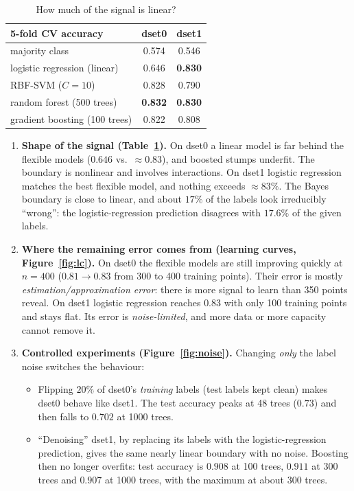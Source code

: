 \documentclass[11pt]{article}
\begin{document}
\begin{table}[H]\centering\small
\begin{tabular}{lcc}
\toprule
5-fold CV accuracy & dset0 & dset1\\
\midrule
majority class                     & 0.574 & 0.546\\
logistic regression (linear)       & 0.646 & \textbf{0.830}\\
RBF-SVM ($C=10$)                   & 0.828 & 0.790\\
random forest (500 trees)          & \textbf{0.832} & \textbf{0.830}\\
gradient boosting (100 trees)      & 0.822 & 0.808\\
\bottomrule
\end{tabular}
\caption{How much of the signal is linear?}
\label{tab:diag}
\end{table}

\begin{enumerate}
\item \textbf{Shape of the signal (Table~\ref{tab:diag}).} On dset0 a linear model is far behind
the flexible models ($0.646$ vs.\ $\approx0.83$), and boosted stumps underfit. The boundary is
nonlinear and involves interactions. On dset1 logistic regression matches the best flexible model,
and nothing exceeds $\approx83\%$. The Bayes boundary is close to linear, and about $17\%$ of the
labels look irreducibly ``wrong'': the logistic-regression prediction disagrees with $17.6\%$ of
the given labels.

\item \textbf{Where the remaining error comes from (learning curves, Figure~\ref{fig:lc}).} On
dset0 the flexible models are still improving quickly at $n=400$ ($0.81\to0.83$ from 300 to 400
training points). Their error is mostly \emph{estimation/approximation error}: there is more
signal to learn than 350 points reveal. On dset1 logistic regression reaches $0.83$ with only 100
training points and stays flat. Its error is \emph{noise-limited}, and more data or more capacity
cannot remove it.

\item \textbf{Controlled experiments (Figure~\ref{fig:noise}).} Changing \emph{only} the label
noise switches the behaviour:
\begin{itemize}
\item Flipping $20\%$ of dset0's \emph{training} labels (test labels kept clean) makes dset0 behave
like dset1. The test accuracy peaks at 48 trees ($0.73$) and then falls to $0.702$ at 1000 trees.
\item ``Denoising'' dset1, by replacing its labels with the logistic-regression prediction, gives
the same nearly linear boundary with no noise. Boosting then no longer overfits: test accuracy is
$0.908$ at 100 trees, $0.911$ at 300 trees and $0.907$ at 1000 trees, with the maximum at about 300
trees.
\end{itemize}
\end{enumerate}
\end{document}
